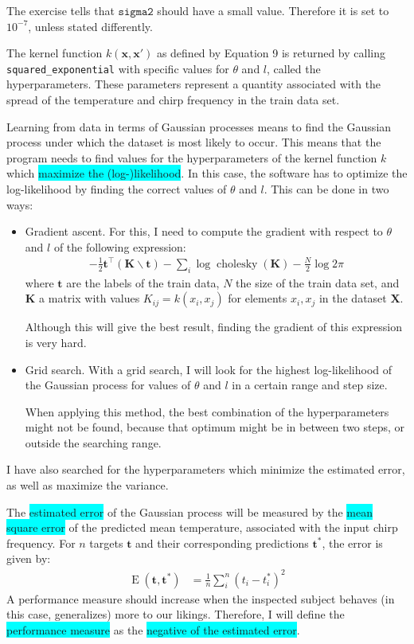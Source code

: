 \documentclass[a4paper,11pt]{article}
\DeclareMathOperator*{\chol}{cholesky}
\DeclareMathOperator*{\err}{E}
\newcommand{\V}[1]{\ensuremath{\boldsymbol{#1}}}
\newcommand{\T}[1]{\ensuremath{\mathtt{#1}}}
\newcommand{\hl}[1]{\colorbox{cyan}{#1}}
\begin{document}
The exercise tells that $\T{sigma2}$ should have a small value.  Therefore it is set to $10^{-7}$, unless stated differently.

The kernel function $k(\V{x}, \V{x}')$ as defined by Equation 9 is returned by calling \texttt{squared\_exponential} with specific values for $\theta$ and $l$, called the hyperparameters.  These parameters represent a quantity associated with the spread of the temperature and chirp frequency in the train data set.

Learning from data in terms of Gaussian processes means to find the Gaussian process under which the dataset is most likely to occur.  This means that the program needs to find values for the hyperparameters of the kernel function $k$ which \hl{maximize the (log-)likelihood}.  In this case, the software has to optimize the log-likelihood by finding the correct values of $\theta$ and $l$.  This can be done in two ways:
\begin{itemize}
\item Gradient ascent.  For this, I need to compute the gradient with respect to $\theta$ and $l$ of the following expression:
\begin{align*}
- \frac{1}{2}\V{t}^\top (\V{K} \backslash \V{t}) - \sum_i \log \chol(\V{K}) - \frac{N}{2} \log 2\pi
\end{align*}
where $\V{t}$ are the labels of the train data, $N$ the size of the train data set, and $\V{K}$ a matrix with values $K_{ij} = k(x_i, x_j)$ for elements $x_i, x_j$ in the dataset $\V{X}$.

Although this will give the best result, finding the gradient of this expression is very hard.

\item Grid search.  With a grid search, I will look for the highest log-likelihood of the Gaussian process for values of $\theta$ and $l$ in a certain range and step size.

When applying this method, the best combination of the hyperparameters might not be found, because that optimum might be in between two steps, or outside the searching range.
\end{itemize}
I have also searched for the hyperparameters which minimize the estimated error, as well as maximize the variance.

The \hl{estimated error} of the Gaussian process will be measured by the \hl{mean square error} of the predicted mean temperature, associated with the input chirp frequency.  For $n$ targets $\V{t}$ and their corresponding predictions $\V{t}^\ast$, the error is given by:
\begin{align*}
\err(\V{t}, \V{t}^\ast)
  &= \frac{1}{n} \sum_i^n \left(t_i - t^\ast_i\right)^2
\end{align*}
A performance measure should increase when the inspected subject behaves (in this case, generalizes) more to our likings.  Therefore, I will define the \hl{performance measure} as the \hl{negative of the estimated error}.
\end{document}
